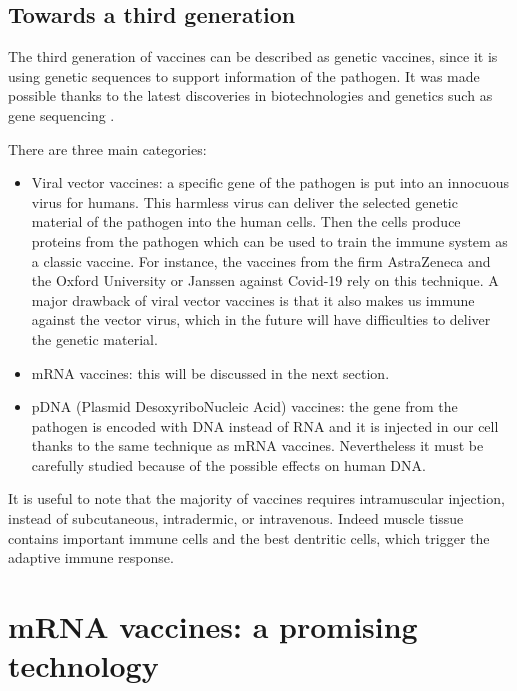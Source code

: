 \documentclass{article}
\begin{document}
        \subsection{Towards a third generation}

            The third generation of vaccines can be described as genetic vaccines, since it is using genetic sequences to support information of the pathogen. 
            It was made possible thanks to the latest discoveries in biotechnologies and genetics such as gene sequencing \autocite{chavdaDNAVaccinesSARSCoV22021}.  

            There are three main categories:
            \begin{itemize}
                \item Viral vector vaccines: a specific gene of the pathogen is put into an innocuous virus for humans. 
                        This harmless virus can deliver the selected genetic material of the pathogen into the human cells.
                        Then the cells produce proteins from the pathogen which can be used to train the immune system as a classic vaccine.
                        For instance, the vaccines from the firm AstraZeneca and the Oxford University or Janssen against Covid-19 rely on this technique.
                        A major drawback of viral vector vaccines is that it also makes us immune against the vector virus, 
                            which in the future will have difficulties to deliver the genetic material.
                \item mRNA vaccines: this will be discussed in the next section.
                \item pDNA (Plasmid DesoxyriboNucleic Acid) vaccines: the gene from the pathogen is encoded with DNA instead of RNA
                    and it is injected in our cell thanks to the same technique as mRNA vaccines.
                    Nevertheless it must be carefully studied because of the possible effects on human DNA.
            \end{itemize}

            It is useful to note that the majority of vaccines requires intramuscular injection, instead of subcutaneous, intradermic, or intravenous.
                Indeed muscle tissue contains important immune cells and the best dentritic cells, which trigger the adaptive immune response.


    \section{mRNA vaccines: a promising technology}
\end{document}
